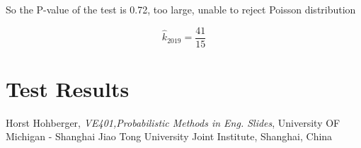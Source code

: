 \documentclass[conf]{new-aiaa}
\begin{document}
So the P-value of the test is 0.72, too large, unable to reject Poisson distribution

$$\hat{k}_{2019}=\frac{41}{15}$$

\newpage

\section{Test Results}


\begin{thebibliography}{9}
Horst Hohberger, \emph{VE401,Probabilistic Methods in Eng. Slides}, University OF Michigan - Shanghai Jiao Tong University Joint Institute, Shanghai, China

\end{thebibliography}
\end{document}
